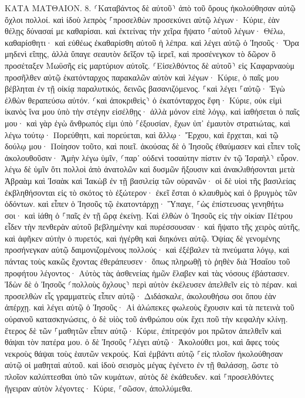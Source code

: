 \documentclass[twoside, 9pt]{extreport}
\begin{document}
ΚΑΤΑ ΜΑΤΘΑΙΟΝ.
8.
⸂Καταβάντος δὲ αὐτοῦ⸃ ἀπὸ τοῦ ὄρους ἠκολούθησαν αὐτῷ ὄχλοι πολλοί. 
καὶ ἰδοὺ λεπρὸς ⸀προσελθὼν προσεκύνει αὐτῷ λέγων· Κύριε, ἐὰν θέλῃς δύνασαί με καθαρίσαι. 
καὶ ἐκτείνας τὴν χεῖρα ἥψατο ⸀αὐτοῦ λέγων· Θέλω, καθαρίσθητι· καὶ εὐθέως ἐκαθαρίσθη αὐτοῦ ἡ λέπρα. 
καὶ λέγει αὐτῷ ὁ Ἰησοῦς· Ὅρα μηδενὶ εἴπῃς, ἀλλὰ ὕπαγε σεαυτὸν δεῖξον τῷ ἱερεῖ, καὶ προσένεγκον τὸ δῶρον ὃ προσέταξεν Μωϋσῆς εἰς μαρτύριον αὐτοῖς. 
⸂Εἰσελθόντος δὲ αὐτοῦ⸃ εἰς Καφαρναοὺμ προσῆλθεν αὐτῷ ἑκατόνταρχος παρακαλῶν αὐτὸν 
καὶ λέγων· Κύριε, ὁ παῖς μου βέβληται ἐν τῇ οἰκίᾳ παραλυτικός, δεινῶς βασανιζόμενος. 
⸀καὶ λέγει ⸀αὐτῷ· Ἐγὼ ἐλθὼν θεραπεύσω αὐτόν. 
⸂καὶ ἀποκριθεὶς⸃ ὁ ἑκατόνταρχος ἔφη· Κύριε, οὐκ εἰμὶ ἱκανὸς ἵνα μου ὑπὸ τὴν στέγην εἰσέλθῃς· ἀλλὰ μόνον εἰπὲ λόγῳ, καὶ ἰαθήσεται ὁ παῖς μου· 
καὶ γὰρ ἐγὼ ἄνθρωπός εἰμι ὑπὸ ⸀ἐξουσίαν, ἔχων ὑπ᾽ ἐμαυτὸν στρατιώτας, καὶ λέγω τούτῳ· Πορεύθητι, καὶ πορεύεται, καὶ ἄλλῳ· Ἔρχου, καὶ ἔρχεται, καὶ τῷ δούλῳ μου· Ποίησον τοῦτο, καὶ ποιεῖ. 
ἀκούσας δὲ ὁ Ἰησοῦς ἐθαύμασεν καὶ εἶπεν τοῖς ἀκολουθοῦσιν· Ἀμὴν λέγω ὑμῖν, ⸂παρ᾽ οὐδενὶ τοσαύτην πίστιν ἐν τῷ Ἰσραὴλ⸃ εὗρον. 
λέγω δὲ ὑμῖν ὅτι πολλοὶ ἀπὸ ἀνατολῶν καὶ δυσμῶν ἥξουσιν καὶ ἀνακλιθήσονται μετὰ Ἀβραὰμ καὶ Ἰσαὰκ καὶ Ἰακὼβ ἐν τῇ βασιλείᾳ τῶν οὐρανῶν· 
οἱ δὲ υἱοὶ τῆς βασιλείας ἐκβληθήσονται εἰς τὸ σκότος τὸ ἐξώτερον· ἐκεῖ ἔσται ὁ κλαυθμὸς καὶ ὁ βρυγμὸς τῶν ὀδόντων. 
καὶ εἶπεν ὁ Ἰησοῦς τῷ ἑκατοντάρχῃ· Ὕπαγε, ⸀ὡς ἐπίστευσας γενηθήτω σοι· καὶ ἰάθη ὁ ⸀παῖς ἐν τῇ ὥρᾳ ἐκείνῃ. 
Καὶ ἐλθὼν ὁ Ἰησοῦς εἰς τὴν οἰκίαν Πέτρου εἶδεν τὴν πενθερὰν αὐτοῦ βεβλημένην καὶ πυρέσσουσαν· 
καὶ ἥψατο τῆς χειρὸς αὐτῆς, καὶ ἀφῆκεν αὐτὴν ὁ πυρετός, καὶ ἠγέρθη καὶ διηκόνει αὐτῷ. 
Ὀψίας δὲ γενομένης προσήνεγκαν αὐτῷ δαιμονιζομένους πολλούς· καὶ ἐξέβαλεν τὰ πνεύματα λόγῳ, καὶ πάντας τοὺς κακῶς ἔχοντας ἐθεράπευσεν· 
ὅπως πληρωθῇ τὸ ῥηθὲν διὰ Ἠσαΐου τοῦ προφήτου λέγοντος· Αὐτὸς τὰς ἀσθενείας ἡμῶν ἔλαβεν καὶ τὰς νόσους ἐβάστασεν. 
Ἰδὼν δὲ ὁ Ἰησοῦς ⸂πολλοὺς ὄχλους⸃ περὶ αὐτὸν ἐκέλευσεν ἀπελθεῖν εἰς τὸ πέραν. 
καὶ προσελθὼν εἷς γραμματεὺς εἶπεν αὐτῷ· Διδάσκαλε, ἀκολουθήσω σοι ὅπου ἐὰν ἀπέρχῃ. 
καὶ λέγει αὐτῷ ὁ Ἰησοῦς· Αἱ ἀλώπεκες φωλεοὺς ἔχουσιν καὶ τὰ πετεινὰ τοῦ οὐρανοῦ κατασκηνώσεις, ὁ δὲ υἱὸς τοῦ ἀνθρώπου οὐκ ἔχει ποῦ τὴν κεφαλὴν κλίνῃ. 
ἕτερος δὲ τῶν ⸀μαθητῶν εἶπεν αὐτῷ· Κύριε, ἐπίτρεψόν μοι πρῶτον ἀπελθεῖν καὶ θάψαι τὸν πατέρα μου. 
ὁ δὲ Ἰησοῦς ⸀λέγει αὐτῷ· Ἀκολούθει μοι, καὶ ἄφες τοὺς νεκροὺς θάψαι τοὺς ἑαυτῶν νεκρούς. 
Καὶ ἐμβάντι αὐτῷ ⸀εἰς πλοῖον ἠκολούθησαν αὐτῷ οἱ μαθηταὶ αὐτοῦ. 
καὶ ἰδοὺ σεισμὸς μέγας ἐγένετο ἐν τῇ θαλάσσῃ, ὥστε τὸ πλοῖον καλύπτεσθαι ὑπὸ τῶν κυμάτων, αὐτὸς δὲ ἐκάθευδεν. 
καὶ ⸀προσελθόντες ἤγειραν αὐτὸν λέγοντες· Κύριε, ⸀σῶσον, ἀπολλύμεθα. 
\end{document}

